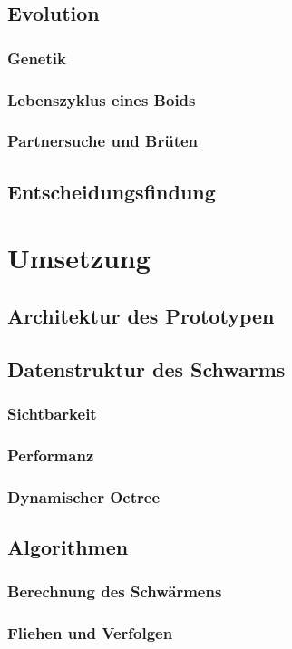 \documentclass[draft=false
              ,paper=a4
              ,twoside=false
              ,fontsize=11pt
              ,headsepline
              ,BCOR10mm
              ,DIV11
              ,bibtotoc
              ,liststotoc
              ]{scrbook}
\begin{document}
\section{Evolution}
\subsection{Genetik}
\subsection{Lebenszyklus eines Boids}
\subsection{Partnersuche und Brüten}

\section{Entscheidungsfindung}

\chapter{Umsetzung}\label{umsetzung}
\section{Architektur des Prototypen}
\section{Datenstruktur des Schwarms}
\subsection{Sichtbarkeit}
\subsection{Performanz}
\subsection{Dynamischer Octree}
\section{Algorithmen}
\subsection{Berechnung des Schwärmens}
\subsection{Fliehen und Verfolgen}
\end{document}
